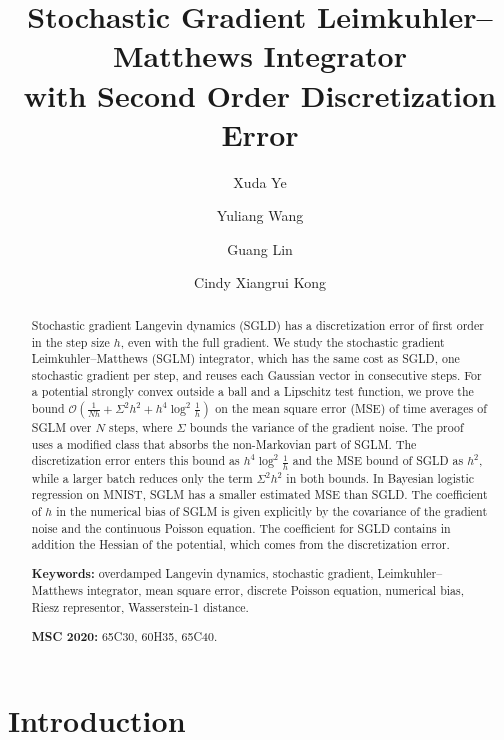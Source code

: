 \documentclass{article}
\title{Stochastic Gradient Leimkuhler--Matthews Integrator \\
	with Second Order Discretization Error}
\author[1]{Xuda Ye}
\author[2]{Yuliang Wang}
\author[1]{Guang Lin}
\author[1]{Cindy Xiangrui Kong}
\affil[1]{Department of Mathematics, Purdue University, West Lafayette, IN 47907}
\affil[2]{Department of Mathematics, Duke University, Durham, NC 27708}
\date{}
\numberwithin{equation}{section}
\begin{document}
\maketitle

\begin{abstract}
Stochastic gradient Langevin dynamics (SGLD) has a discretization error of first order in the step size $h$, even with the full gradient. We study the stochastic gradient Leimkuhler--Matthews (SGLM) integrator, which has the same cost as SGLD, one stochastic gradient per step, and reuses each Gaussian vector in consecutive steps. For a potential strongly convex outside a ball and a Lipschitz test function, we prove the bound $\mathcal O(\frac{1}{Nh} + \Sigma^2 h^2 + h^4 \log^2\frac1h)$ on the mean square error (MSE) of time averages of SGLM over $N$ steps, where $\Sigma$ bounds the variance of the gradient noise. The proof uses a modified class that absorbs the non-Markovian part of SGLM. The discretization error enters this bound as $h^4 \log^2\frac1h$ and the MSE bound of SGLD as $h^2$, while a larger batch reduces only the term $\Sigma^2 h^2$ in both bounds. In Bayesian logistic regression on MNIST, SGLM has a smaller estimated MSE than SGLD. The coefficient of $h$ in the numerical bias of SGLM is given explicitly by the covariance of the gradient noise and the continuous Poisson equation. The coefficient for SGLD contains in addition the Hessian of the potential, which comes from the discretization error. 

\medskip
\noindent\textbf{Keywords:} overdamped Langevin dynamics, stochastic gradient, Leimkuhler--Matthews integrator, mean square error, discrete Poisson equation, numerical bias, Riesz representor, Wasserstein-1 distance.

\smallskip
\noindent\textbf{MSC 2020:} 65C30, 60H35, 65C40.
\end{abstract}

\section{Introduction}
\label{sec: intro}
\end{document}
